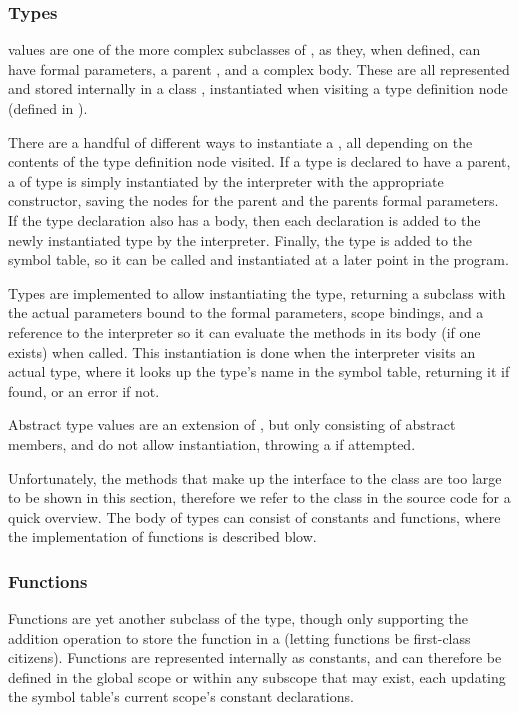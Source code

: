 \subsubsection{Types}
 values are one of the more complex subclasses of
, as they, when defined, can have formal parameters, a parent
, and a complex body. These are all represented and stored
internally in a class , instantiated when visiting a type
definition node (defined in ).

There are a handful of different ways to instantiate a , all
depending on the contents of the type definition node visited.  If a type is
declared to have a parent, a  of type  is simply
instantiated by the interpreter with the appropriate constructor, saving the
nodes for the parent and the parents formal parameters. If the type declaration
also has a body, then each declaration is added to the newly instantiated type
by the interpreter.  Finally, the type is added to the symbol table, so it can
be called and instantiated at a later point in the program.

Types are implemented to allow instantiating the type, returning a
 subclass with the actual parameters bound to the formal
parameters, scope bindings, and a reference to the interpreter so it can
evaluate the methods in its body (if one exists) when called. This
instantiation is done when the interpreter visits an actual type, where it looks
up the type's name in the symbol table, returning it if found, or an error if
not.

Abstract type values are an extension of , but only consisting of
abstract members, and do not allow instantiation, throwing a
 if attempted.

Unfortunately, the methods that make up the interface to the 
class are too large to be shown in this section, therefore we refer to the
 class in the source code for a quick overview. The body of
types can consist of constants and functions, where the implementation of
functions is described blow.

\subsubsection{Functions}
Functions are yet another subclass of the  type,
though only supporting the addition operation to store the function in
a  (letting functions be first-class citizens).
Functions are represented internally as constants, and can therefore be
defined in the global scope or within any subscope that may exist, each
updating the symbol table's current scope's constant declarations.

